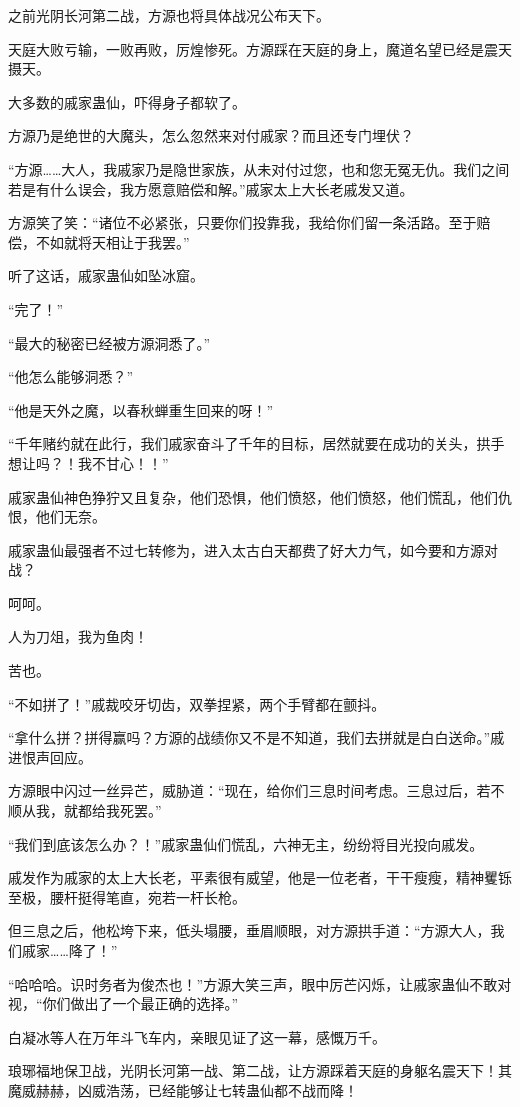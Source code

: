 \begin{this_body}
之前光阴长河第二战，方源也将具体战况公布天下。

天庭大败亏输，一败再败，厉煌惨死。方源踩在天庭的身上，魔道名望已经是震天摄天。

大多数的戚家蛊仙，吓得身子都软了。

方源乃是绝世的大魔头，怎么忽然来对付戚家？而且还专门埋伏？

“方源……大人，我戚家乃是隐世家族，从未对付过您，也和您无冤无仇。我们之间若是有什么误会，我方愿意赔偿和解。”戚家太上大长老戚发又道。

方源笑了笑：“诸位不必紧张，只要你们投靠我，我给你们留一条活路。至于赔偿，不如就将天相让于我罢。”

听了这话，戚家蛊仙如坠冰窟。

“完了！”

“最大的秘密已经被方源洞悉了。”

“他怎么能够洞悉？”

“他是天外之魔，以春秋蝉重生回来的呀！”

“千年赌约就在此行，我们戚家奋斗了千年的目标，居然就要在成功的关头，拱手想让吗？！我不甘心！！”

戚家蛊仙神色狰狞又且复杂，他们恐惧，他们愤怒，他们愤怒，他们慌乱，他们仇恨，他们无奈。

戚家蛊仙最强者不过七转修为，进入太古白天都费了好大力气，如今要和方源对战？

呵呵。

人为刀俎，我为鱼肉！

苦也。

“不如拼了！”戚裁咬牙切齿，双拳捏紧，两个手臂都在颤抖。

“拿什么拼？拼得赢吗？方源的战绩你又不是不知道，我们去拼就是白白送命。”戚进恨声回应。

方源眼中闪过一丝异芒，威胁道：“现在，给你们三息时间考虑。三息过后，若不顺从我，就都给我死罢。”

“我们到底该怎么办？！”戚家蛊仙们慌乱，六神无主，纷纷将目光投向戚发。

戚发作为戚家的太上大长老，平素很有威望，他是一位老者，干干瘦瘦，精神矍铄至极，腰杆挺得笔直，宛若一杆长枪。

但三息之后，他松垮下来，低头塌腰，垂眉顺眼，对方源拱手道：“方源大人，我们戚家……降了！”

“哈哈哈。识时务者为俊杰也！”方源大笑三声，眼中厉芒闪烁，让戚家蛊仙不敢对视，“你们做出了一个最正确的选择。”

白凝冰等人在万年斗飞车内，亲眼见证了这一幕，感慨万千。

琅琊福地保卫战，光阴长河第一战、第二战，让方源踩着天庭的身躯名震天下！其魔威赫赫，凶威浩荡，已经能够让七转蛊仙都不战而降！


\end{this_body}
